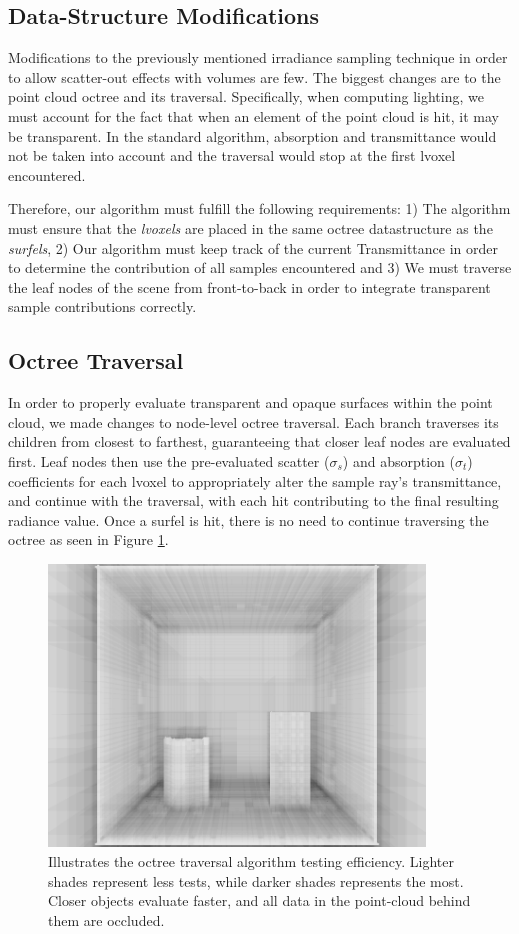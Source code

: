 \documentclass[12pt]{ucthesis}
\begin{document}
\subsection{Data-Structure Modifications}
Modifications to the previously mentioned irradiance sampling technique in order to allow scatter-out effects with volumes are few.  The biggest changes are to the point cloud octree and its traversal.  Specifically, when computing lighting, we must account for the fact that when an element of the point cloud is hit, it may be transparent.  In the standard algorithm, absorption and transmittance would not be taken into account and the traversal would stop at the first lvoxel encountered.

Therefore, our algorithm must fulfill the following requirements: 1) The algorithm must ensure that the \textit{lvoxels} are placed in the same octree datastructure as the \textit{surfels}, 2) Our algorithm must keep track of the current Transmittance in order to determine the contribution of all samples encountered and 3) We must traverse the leaf nodes of the scene from front-to-back in order to integrate transparent sample contributions correctly.

\subsection{Octree Traversal}

In order to properly evaluate transparent and opaque surfaces within the point cloud, we made changes to node-level octree traversal.  Each branch traverses its children from closest to farthest, guaranteeing that closer leaf nodes are evaluated first.  Leaf nodes then use the pre-evaluated scatter ($\sigma_{s}$) and absorption ($\sigma_{t}$) coefficients for each lvoxel to appropriately alter the sample ray's transmittance, and continue with the traversal, with each hit contributing to the final resulting radiance value.  Once a surfel is hit, there is no need to continue traversing the octree as seen in Figure \ref{fig:testing}.

\begin{figure}[h!]
    \centering
    \includegraphics[width=100mm]{img/testing.png}
    \caption{Illustrates the octree traversal algorithm testing efficiency.  Lighter shades represent less tests, while darker shades represents the most.  Closer objects evaluate faster, and all data in the point-cloud behind them are occluded.}
    \label{fig:testing}
\end{figure}
\end{document}

